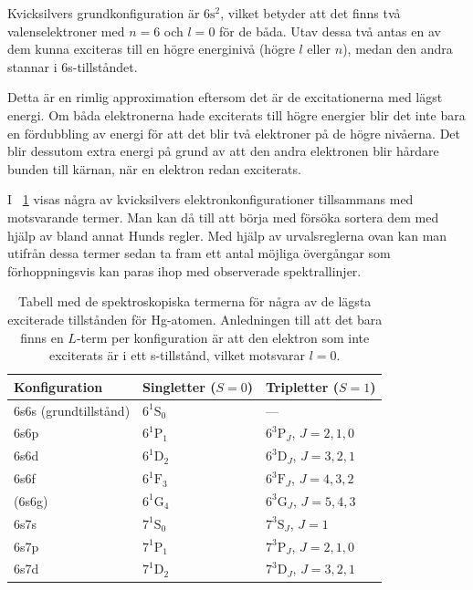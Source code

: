 \documentclass[11pt,a4paper]{article}
\newcommand{\tabref}{\tablename~\ref} %
\begin{document}
Kvicksilvers grundkonfiguration är $6\mathrm{s}^2$, vilket betyder att det
finns två valenselektroner med $n=6$ och $l=0$ för de båda. Utav dessa
två antas en av dem kunna exciteras till en högre energinivå (högre
$l$ eller $n$), medan den andra stannar i 6s-tillståndet. 

Detta är en rimlig approximation eftersom det är de excitationerna
med lägst energi. Om båda elektronerna hade exciterats till högre
energier blir det inte bara en fördubbling av energi för att
det blir två elektroner på de högre nivåerna. Det blir dessutom extra
energi på grund av att den andra elektronen blir hårdare bunden till
kärnan, när en elektron redan exciterats. 

I \tabref{tab:Hg_termer} visas några av kvicksilvers
elektronkonfigurationer tillsammans med motsvarande termer. Man kan då
till att börja med försöka sortera dem med hjälp av bland annat Hunds
regler. 
Med hjälp av urvalsreglerna ovan kan man utifrån dessa termer sedan 
ta fram ett antal möjliga övergångar som förhoppningsvis kan paras ihop
med observerade spektrallinjer. 

\begin{table}
\centering
\caption{Tabell med de spektroskopiska termerna för några av de lägsta
exciterade tillstånden för Hg-atomen. Anledningen till att det bara
finns en $L$-term per konfiguration  är att den elektron
som inte exciterats är i ett s-tillstånd, vilket motsvarar $l=0$.}
\label{tab:Hg_termer}
\begin{tabular}{|l|l|l|}\hline
Konfiguration & Singletter ($S=0$) & Tripletter ($S=1$)
\\ \hline\hline
6s6s (grundtillstånd) & $6^1\mathrm{S}_0$ & --- \\ 
\hline
6s6p & $6^1\mathrm{P}_1$ & $6^3\mathrm{P}_J$, $J=2, 1, 0$ \\
6s6d & $6^1\mathrm{D}_2$ & $6^3\mathrm{D}_J$, $J=3, 2, 1$ \\
6s6f & $6^1\mathrm{F}_3$ & $6^3\mathrm{F}_J$, $J=4, 3, 2$ \\
(6s6g) & $6^1\mathrm{G}_4$ & $6^3\mathrm{G}_J$, $J=5, 4, 3$ \\
\hline
6s7s & $7^1\mathrm{S}_0$ & $7^3\mathrm{S}_J$, $J=1$ \\
6s7p & $7^1\mathrm{P}_1$ & $7^3\mathrm{P}_J$, $J=2, 1, 0$ \\
6s7d & $7^1\mathrm{D}_2$ & $7^3\mathrm{D}_J$, $J=3, 2, 1$ \\ 
\hline

\end{tabular}
\end{table}
\end{document}
